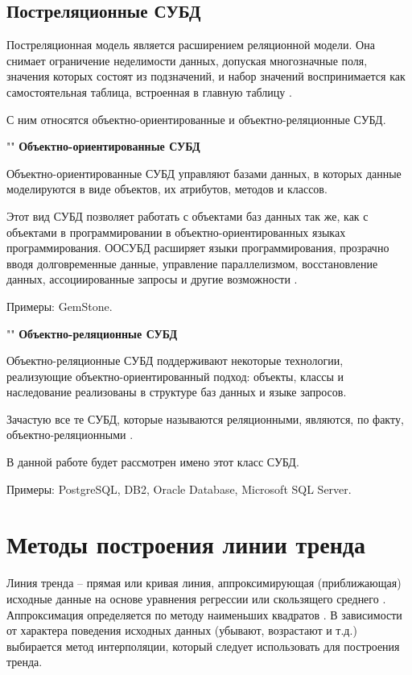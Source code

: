 \documentclass{bmstu}
\begin{document}
\subsection*{Постреляционные СУБД}

Постреляционная модель является расширением реляционной модели. Она снимает ограничение неделимости данных, допуская многозначные поля, значения которых состоят из подзначений, и набор значений воспринимается как самостоятельная таблица, встроенная в главную таблицу \cite{post_rel}.

С ним относятся объектно-ориентированные и объектно-реляционные СУБД.

""\newline
\noindent\textbf{Объектно-ориентированные СУБД}

Объектно-ориентированные СУБД управляют базами данных, в которых данные моделируются в виде объектов, их атрибутов, методов и классов.

Этот вид СУБД позволяет работать с объектами баз данных так же, как с объектами в программировании в объектно-ориентированных языках программирования. ООСУБД расширяет языки программирования, прозрачно вводя долговременные данные, управление параллелизмом, восстановление данных, ассоциированные запросы и другие возможности  \cite{dbms}.

Примеры: GemStone.

""\newline
\noindent\textbf{Объектно-реляционные СУБД}

Объектно-реляционные СУБД поддерживают некоторые технологии, реализующие объектно-ориентированный подход: объекты, классы и наследование реализованы в структуре баз данных и языке запросов.

Зачастую все те СУБД, которые называются реляционными, являются, по факту, объектно-реляционными \cite{dbms}.

В данной работе будет рассмотрен имено этот класс СУБД.

Примеры: PostgreSQL, DB2, Oracle Database, Microsoft SQL Server.


\section{Методы построения линии тренда}

Линия тренда -- прямая или кривая линия, аппроксимирующая (приближающая) исходные данные на основе уравнения регрессии или скользящего среднего \cite{lt_exel}. Аппроксимация определяется по ме­тоду наименьших квадратов \cite{mnk}. В зависимости от характера поведения исходных данных (убыва­ют, возрастают и т.д.) выбирается метод интерполяции, который сле­дует использовать для построения тренда.
\end{document}
